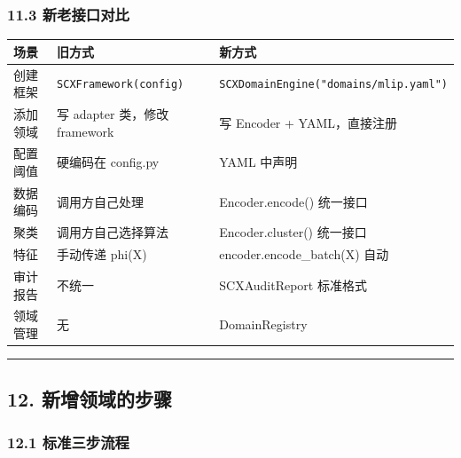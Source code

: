 \documentclass[
  12pt,
]{ctexart}
\begin{document}
\subsubsection{11.3
新老接口对比}\label{ux65b0ux8001ux63a5ux53e3ux5bf9ux6bd4}

\begin{longtable}[]{@{}
  >{\raggedright\arraybackslash}p{}
  >{\raggedright\arraybackslash}p{}
  >{\raggedright\arraybackslash}p{}@{}}
\toprule\noalign{}
\begin{minipage}[b]{\linewidth}\raggedright
场景
\end{minipage} & \begin{minipage}[b]{\linewidth}\raggedright
旧方式
\end{minipage} & \begin{minipage}[b]{\linewidth}\raggedright
新方式
\end{minipage} \\
\midrule\noalign{}
\endhead
\bottomrule\noalign{}
\endlastfoot
创建框架 & \texttt{SCXFramework(config)} &
\texttt{SCXDomainEngine("domains/mlip.yaml")} \\
添加领域 & 写 adapter 类，修改 framework & 写 Encoder +
YAML，直接注册 \\
配置阈值 & 硬编码在 config.py & YAML 中声明 \\
数据编码 & 调用方自己处理 & Encoder.encode() 统一接口 \\
聚类 & 调用方自己选择算法 & Encoder.cluster() 统一接口 \\
特征 & 手动传递 phi(X) & encoder.encode\_batch(X) 自动 \\
审计报告 & 不统一 & SCXAuditReport 标准格式 \\
领域管理 & 无 & DomainRegistry \\
\end{longtable}

\begin{center}\rule{0.5\linewidth}{0.5pt}\end{center}

\subsection{12.
新增领域的步骤}\label{ux65b0ux589eux9886ux57dfux7684ux6b65ux9aa4}

\subsubsection{12.1
标准三步流程}\label{ux6807ux51c6ux4e09ux6b65ux6d41ux7a0b}
\end{document}
